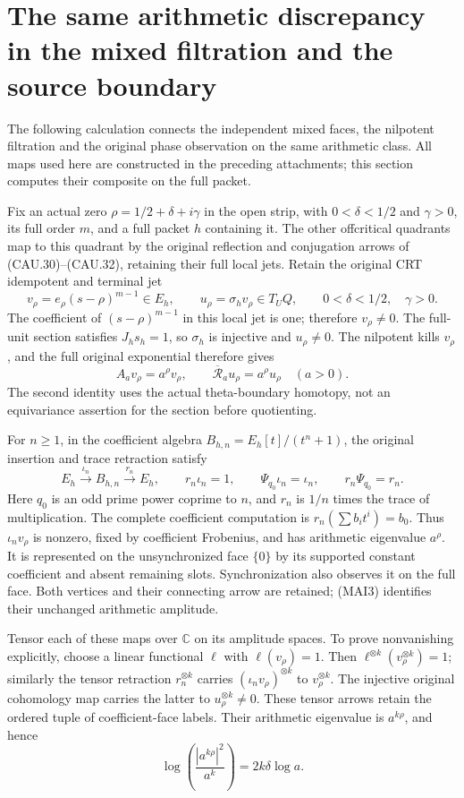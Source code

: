 \section{The same arithmetic discrepancy in the mixed filtration and the source boundary}
\label{sec:mixed-amplification-identity}

The following calculation connects the independent mixed faces, the
nilpotent filtration and the original phase observation on the same
arithmetic class. All maps used here are constructed in the preceding
attachments; this section computes their composite on the full packet.

Fix an actual zero $\rho=1/2+\delta+i\gamma$ in the open strip,
with $0<\delta<1/2$ and $\gamma>0$, its full order $m$, and a
full packet $h$ containing it. The other offcritical quadrants
map to this quadrant by the original reflection and conjugation
arrows of (CAU.30)--(CAU.32), retaining their full local jets.
Retain
the original CRT idempotent and terminal jet
\[
 v_\rho=e_\rho(s-\rho)^{m-1}\in E_h,
 \qquad u_\rho=\sigma_hv_\rho\in T_UQ,
 \qquad 0<\delta<1/2,\quad\gamma>0.
 \tag{MAI1}
\]
The coefficient of $(s-\rho)^{m-1}$ in this local jet is one;
therefore $v_\rho\ne0$. The full-unit section satisfies
$J_hs_h=1$, so $\sigma_h$ is injective and $u_\rho\ne0$.
The nilpotent kills $v_\rho$, and the full original exponential
therefore gives
\[
 A_av_\rho=a^\rho v_\rho,
 \qquad \overline{\mathcal R}_a u_\rho=a^\rho u_\rho
 \quad(a>0).
 \tag{MAI2}
\]
The second identity uses the actual theta-boundary homotopy, not an
equivariance assertion for the section before quotienting.

For $n\geq1$, in the coefficient algebra $B_{h,n}=E_h[t]/(t^n+1)$, the original
insertion and trace retraction satisfy
\[
 E_h\xrightarrow{\iota_n}B_{h,n}\xrightarrow{r_n}E_h,
 \qquad r_n\iota_n=1,
 \qquad \Psi_{q_0}\iota_n=\iota_n,
 \qquad r_n\Psi_{q_0}=r_n.
 \tag{MAI3}
\]
Here $q_0$ is an odd prime power coprime to $n$, and $r_n$ is $1/n$ times
the trace of multiplication. The complete coefficient computation
is $r_n(\sum b_it^i)=b_0$. Thus $\iota_nv_\rho$ is nonzero,
fixed by coefficient Frobenius, and has arithmetic eigenvalue
$a^\rho$. It is represented on the unsynchronized face $\{0\}$
by its supported constant coefficient and absent remaining slots.
Synchronization also observes it on the full face. Both vertices
and their connecting arrow are retained; (MAI3) identifies their
unchanged arithmetic amplitude.

Tensor each of these maps over $\mathbb C$ on its amplitude
spaces. To prove nonvanishing explicitly, choose a linear
functional $\ell$ with $\ell(v_\rho)=1$. Then
$\ell^{\otimes k}(v_\rho^{\otimes k})=1$; similarly the tensor
retraction $r_n^{\otimes k}$ carries
$(\iota_nv_\rho)^{\otimes k}$ to $v_\rho^{\otimes k}$.
The injective original cohomology map carries the latter to
$u_\rho^{\otimes k}\ne0$. These tensor arrows retain the ordered
tuple of coefficient-face labels. Their arithmetic eigenvalue is
$a^{k\rho}$, and hence
\[
 \log\!\left(\frac{|a^{k\rho}|^2}{a^k}\right)
       =2k\delta\log a.
 \tag{MAI4}
\]

